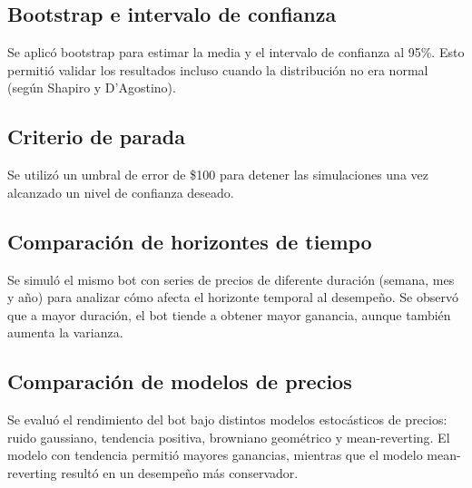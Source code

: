 \documentclass[a4paper,12pt]{article}
\begin{document}
\subsection*{Bootstrap e intervalo de confianza}

Se aplicó bootstrap para estimar la media y el intervalo de confianza al 95\%. Esto permitió validar los resultados incluso cuando la distribución no era normal (según Shapiro y D’Agostino).


\subsection*{Criterio de parada}

Se utilizó un umbral de error de \$100 para detener las simulaciones una vez alcanzado un nivel de confianza deseado.


\subsection*{Comparación de horizontes de tiempo}

Se simuló el mismo bot con series de precios de diferente duración (semana, mes y año) para analizar cómo afecta el horizonte temporal al desempeño.
Se observó que a mayor duración, el bot tiende a obtener mayor ganancia, aunque también aumenta la varianza.

\subsection*{Comparación de modelos de precios}
Se evaluó el rendimiento del bot bajo distintos modelos estocásticos de precios: ruido gaussiano, tendencia positiva, browniano geométrico y mean-reverting.
El modelo con tendencia permitió mayores ganancias, mientras que el modelo mean-reverting resultó en un desempeño más conservador.
\end{document}
